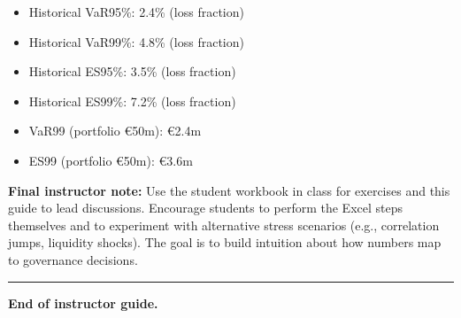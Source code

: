 \documentclass[11pt]{article}
\begin{document}
\begin{itemize}
  \item Historical VaR95\%: 2.4\% (loss fraction)
  \item Historical VaR99\%: 4.8\% (loss fraction)
  \item Historical ES95\%: 3.5\% (loss fraction)
  \item Historical ES99\%: 7.2\% (loss fraction)
  \item VaR99 (portfolio \euro 50m): \euro 2.4m
  \item ES99 (portfolio \euro 50m): \euro 3.6m
\end{itemize}

\textbf{Final instructor note:} Use the student workbook in class for exercises and this guide to lead discussions. Encourage students to perform the Excel steps themselves and to experiment with alternative stress scenarios (e.g., correlation jumps, liquidity shocks). The goal is to build intuition about how numbers map to governance decisions.

\bigskip
\hrule
\bigskip
\noindent\textbf{End of instructor guide.}
\end{document}
